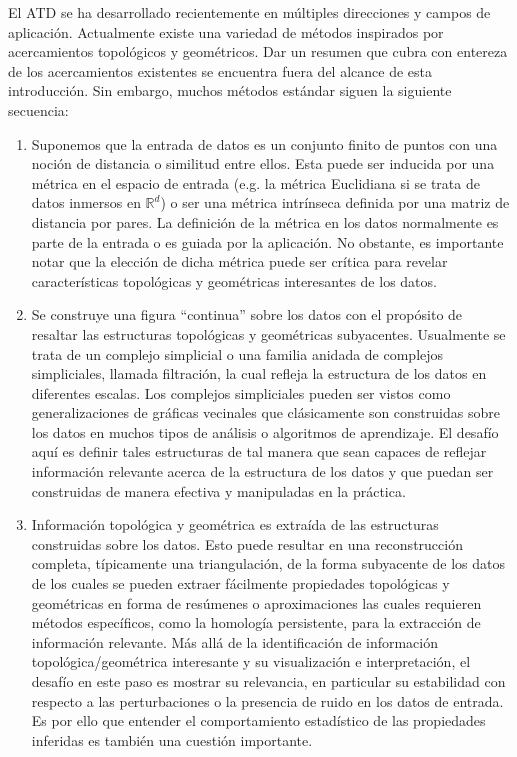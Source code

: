 El ATD se ha desarrollado recientemente en m\'ultiples direcciones y campos de aplicaci\'on.
Actualmente existe una variedad de m\'etodos inspirados por acercamientos topol\'ogicos y
geom\'etricos. Dar un resumen que cubra con entereza de los acercamientos
existentes se encuentra fuera del alcance de esta introducci\'on. Sin embargo, muchos m\'etodos
est\'andar siguen la siguiente secuencia:

\begin{enumerate}
    \item Suponemos que la entrada de datos es un conjunto finito de puntos con una noci\'on
    de distancia o similitud entre ellos. Esta puede ser inducida por una m\'etrica en el
    espacio de entrada (e.g. la m\'etrica Euclidiana si se trata de datos inmersos en
    $\mathbb{R}^{d}$) o ser una m\'etrica intr\'inseca definida por una matriz de distancia
    por pares. La definici\'on de la m\'etrica en los datos normalmente es parte de la entrada
    o es guiada por la aplicaci\'on. No obstante, es importante notar que la elecci\'on de
    dicha m\'etrica puede ser cr\'itica para revelar caracter\'isticas topol\'ogicas y
    geom\'etricas interesantes de los datos.
    
    \item Se construye una figura ``continua'' sobre los datos con el prop\'osito de resaltar
    las estructuras topol\'ogicas y geom\'etricas subyacentes. Usualmente se trata de
    un complejo simplicial o una familia anidada de complejos simpliciales, llamada filtraci\'on,
    la cual refleja la estructura de los datos en diferentes escalas. Los complejos simpliciales
    pueden ser vistos como generalizaciones de gr\'aficas vecinales que cl\'asicamente son
    construidas sobre los datos en muchos tipos de an\'alisis o algoritmos de aprendizaje.
    El desaf\'io aqu\'i es definir tales estructuras de tal manera que sean capaces de
    reflejar informaci\'on relevante acerca de la estructura de los datos y que puedan ser
    construidas de manera efectiva y manipuladas en la pr\'actica.
    
    \item Informaci\'on topol\'ogica y geom\'etrica es extra\'ida de las estructuras construidas
    sobre los datos. Esto puede resultar en una reconstrucci\'on completa, t\'ipicamente una
    triangulaci\'on, de la forma subyacente de los datos de los cuales se pueden extraer
    f\'acilmente propiedades topol\'ogicas y geom\'etricas en forma de res\'umenes o
    aproximaciones las cuales requieren m\'etodos espec\'ificos, como la homolog\'ia persistente,
    para la extracci\'on de informaci\'on relevante. M\'as all\'a de la identificaci\'on
    de informaci\'on topol\'ogica/geom\'etrica interesante y su visualizaci\'on e
    interpretaci\'on, el desaf\'io en este paso es mostrar su relevancia, en particular su
    estabilidad con respecto a las perturbaciones o la presencia de ruido en los datos de entrada.
    Es por ello que entender el comportamiento estad\'istico de las propiedades inferidas es
    tambi\'en una cuesti\'on importante.
    

\end{enumerate}
